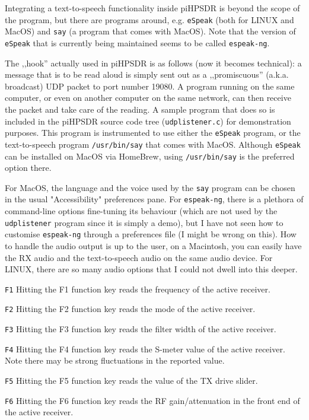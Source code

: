 \documentclass[12pt]{book}
\def\rett#1{\texttt{\color{red}#1}}
\def\pH{pi\-HPSDR\xspace}
\begin{document}
Integrating a text-to-speech functionality inside \pH is beyond the scope of the program,
but there are programs around, e.g. \texttt{eSpeak} (both for LINUX and MacOS) and
\texttt{say} (a program that comes with MacOS). Note that the version of \texttt{eSpeak}
that is currently being maintained seems to be called \texttt{espeak-ng}.

The ,,hook'' actually used
in \pH is as follows (now it becomes technical): a message that is to be read aloud is
simply sent out as a ,,promiscuous'' (a.k.a. broadcast) UDP packet to port number 19080.
A program running on the same computer, or even on another computer on the same network, can
then receive the packet and take care of the reading. A sample program that does so
is included in the \pH source code tree (\texttt{udplistener.c}) for demonstration purposes.
This program is instrumented to use either the \texttt{eSpeak} program, or the text-to-speech
program \texttt{/usr/bin/say} that comes with MacOS. Although \texttt{eSpeak} can
be installed on MacOS via HomeBrew, using  \texttt{/usr/bin/say}  is the preferred option there.

For MacOS, the language and the voice used by the \texttt{say} program can be chosen in
the usual "Accessibility" preferences pane. For \texttt{espeak-ng}, there is a plethora of
command-line options fine-tuning its behaviour (which are not used by the \texttt{udplistener}
program since it is simply a demo), but I have not seen how to customise \texttt{espeak-ng}
through a preferences file (I might be wrong on this). How to handle the audio output
is up to the user, on a Macintosh, you can easily have the RX audio and the text-to-speech
audio on the same audio device. For LINUX, there are so many audio options that I could
not dwell into this deeper.

\rett{F1} Hitting the F1 function key reads the frequency of the active receiver.

\rett{F2} Hitting the F2 function key reads the mode of the active receiver.

\rett{F3} Hitting the F3 function key reads the filter width of the active receiver.

\rett{F4} Hitting the F4 function key reads the S-meter value of the active receiver.
Note there may be strong fluctuations in the reported value.

\rett{F5} Hitting the F5 function key reads the value of the TX drive slider.

\rett{F6} Hitting the F6 function key reads the RF gain/attenuation in the front
end of the active receiver.
\end{document}
